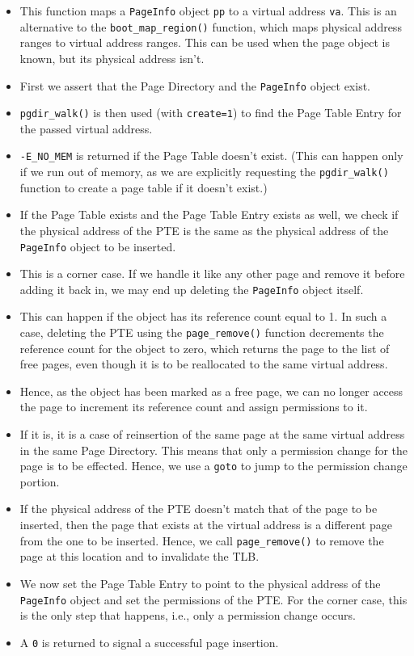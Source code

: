 \documentclass[]{article}
\begin{document}
\begin{enumerate}
  \begin{itemize}
  \itemsep1pt\parskip0pt
  \item
    This function maps a \texttt{PageInfo} object \texttt{pp} to a
    virtual address \texttt{va}. This is an alternative to the
    \texttt{boot\_map\_region()} function, which maps physical address
    ranges to virtual address ranges. This can be used when the page
    object is known, but its physical address isn't.
  \item
    First we assert that the Page Directory and the \texttt{PageInfo}
    object exist.
  \item
    \texttt{pgdir\_walk()} is then used (with \texttt{create=1}) to find
    the Page Table Entry for the passed virtual address.
  \item
    \texttt{-E\_NO\_MEM} is returned if the Page Table doesn't exist.
    (This can happen only if we run out of memory, as we are explicitly
    requesting the \texttt{pgdir\_walk()} function to create a page
    table if it doesn't exist.)
  \item
    If the Page Table exists and the Page Table Entry exists as well, we
    check if the physical address of the PTE is the same as the physical
    address of the \texttt{PageInfo} object to be inserted.
  \item
    This is a corner case. If we handle it like any other page and
    remove it before adding it back in, we may end up deleting the
    \texttt{PageInfo} object itself.
  \item
    This can happen if the object has its reference count equal to 1. In
    such a case, deleting the PTE using the \texttt{page\_remove()}
    function decrements the reference count for the object to zero,
    which returns the page to the list of free pages, even though it is
    to be reallocated to the same virtual address.
  \item
    Hence, as the object has been marked as a free page, we can no
    longer access the page to increment its reference count and assign
    permissions to it.
  \item
    If it is, it is a case of reinsertion of the same page at the same
    virtual address in the same Page Directory. This means that only a
    permission change for the page is to be effected. Hence, we use a
    \texttt{goto} to jump to the permission change portion.
  \item
    If the physical address of the PTE doesn't match that of the page to
    be inserted, then the page that exists at the virtual address is a
    different page from the one to be inserted. Hence, we call
    \texttt{page\_remove()} to remove the page at this location and to
    invalidate the TLB.
  \item
    We now set the Page Table Entry to point to the physical address of
    the \texttt{PageInfo} object and set the permissions of the PTE. For
    the corner case, this is the only step that happens, i.e., only a
    permission change occurs.
  \item
    A \texttt{0} is returned to signal a successful page insertion.
  \end{itemize}
\end{enumerate}
\end{document}

